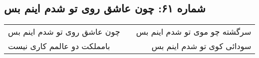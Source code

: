 \begin{center}
\section*{شماره ۶۱: چون عاشق روی تو شدم اینم بس}
\label{sec:061}
\begin{longtable}{l p{0.5cm} r}
چون عاشق روی تو شدم اینم بس
&&
سرگشته چو موی تو شدم اینم بس
\\
بامملکت دو عالمم کاری نیست
&&
سودائی کوی تو شدم اینم بس
\\
\end{longtable}
\end{center}
